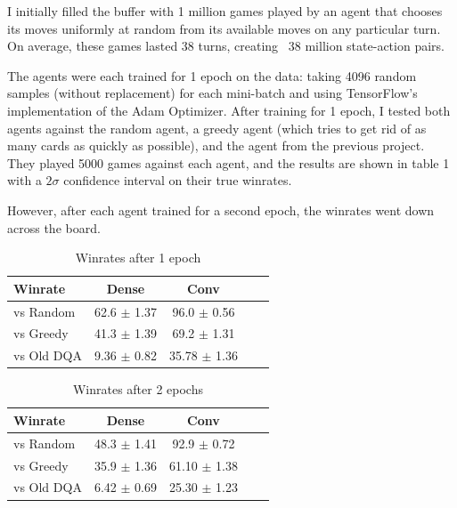 \documentclass{article}
\begin{document}
I initially filled the buffer with 1 million games played by an agent that chooses its moves uniformly at random from its available moves on any particular turn. On average, these games lasted 38 turns, creating ~38 million state-action pairs. 

The agents were each trained for 1 epoch on the data: taking 4096 random samples (without replacement) for each mini-batch and using TensorFlow's implementation of the Adam Optimizer. After training for 1 epoch, I tested both agents against the random agent, a greedy agent (which tries to get rid of as many cards as quickly as possible), and the agent from the previous project. They played 5000 games against each agent, and the results are shown in table 1 with a $2\sigma$ confidence interval on their true winrates. 

However, after each agent trained for a second epoch, the winrates went down across the board.

\begin{table}[t]
\caption{Winrates after 1 epoch}
\label{sample-table}
\vskip 0.15in
\begin{center}
\begin{small}
\begin{sc}
\begin{tabular}{lcccr}
\toprule
Winrate & Dense & Conv  \\
\midrule
vs Random&  62.6 $\pm$ 1.37 & 96.0 $\pm$ 0.56\\
vs Greedy& 41.3 $\pm$ 1.39 & 69.2 $\pm$ 1.31& \\
vs Old DQA& 9.36 $\pm$ 0.82& 35.78 $\pm$ 1.36 \\
\bottomrule
\end{tabular}
\end{sc}
\end{small}
\end{center}
\vskip -0.1in
\end{table}

\begin{table}[t]
\caption{Winrates after 2 epochs}
\label{sample-table}
\vskip 0.15in
\begin{center}
\begin{small}
\begin{sc}
\begin{tabular}{lcccr}
\toprule
Winrate & Dense & Conv  \\
\midrule
vs Random&  48.3 $\pm$ 1.41 & 92.9 $\pm$ 0.72\\
vs Greedy& 35.9 $\pm$ 1.36 & 61.10 $\pm$ 1.38 \\
vs Old DQA& 6.42 $\pm$  0.69 & 25.30 $\pm$ 1.23 \\
\bottomrule
\end{tabular}
\end{sc}
\end{small}
\end{center}
\vskip -0.1in
\end{table}
\end{document}
